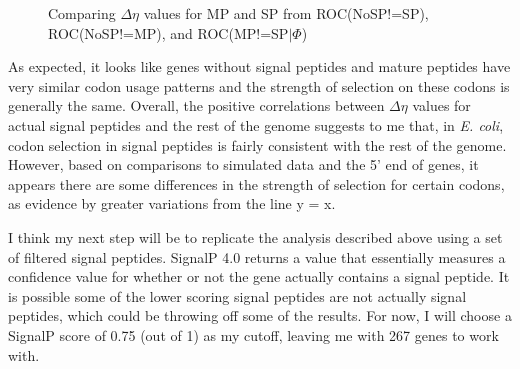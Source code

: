 \documentclass[11pt]{labbook}
\begin{document}
\begin{figure}
\begin{subfigure}{0.55\textwidth}
\end{subfigure}
\caption{Comparing $\Delta\eta$ values for MP and SP from ROC(NoSP!=SP), ROC(NoSP!=MP), and ROC(MP!=SP$|\Phi$)}
\end{figure}
\newpage

As expected, it looks like genes without signal peptides and mature peptides have very similar codon usage patterns and the strength of selection on these codons is generally the same. Overall, the positive correlations between $\Delta\eta$ values for actual signal peptides and the rest of the genome suggests to me that, in \textit{E. coli}, codon selection in signal peptides is fairly consistent with the rest of the genome. However, based on comparisons to simulated data and the 5' end of genes, it appears there are some differences in the strength of selection for certain codons, as evidence by greater variations from the line y = x.

I think my next step will be to replicate the analysis described above using a set of filtered signal peptides. SignalP 4.0 returns a value that essentially measures a confidence value for whether or not the gene actually contains a signal peptide. It is possible some of the lower scoring signal peptides are not actually signal peptides, which could be throwing off some of the results. For now, I will choose a SignalP score of 0.75 (out of 1) as my cutoff, leaving me with 267 genes to work with. 
\end{document}
